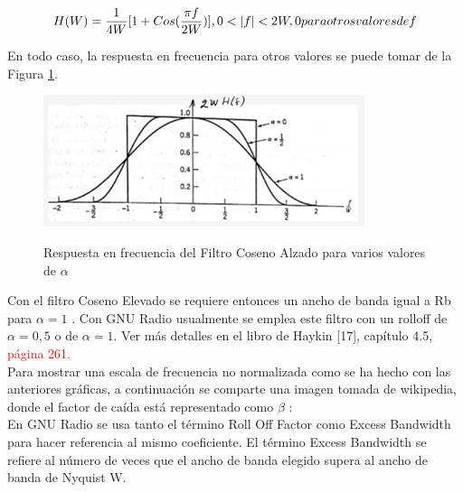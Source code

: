 \begin{equation} \label{capcuatro_veintiuno}
	 H(W) = \dfrac{1}{4W}[1+Cos(\frac{\pi f}{2W})] \space , 0 < |f| < 2W,\space  0 para otros valores de f
\end{equation}

En todo caso, la respuesta en frecuencia para otros valores se puede tomar de la Figura \ref{fig:Coseno-elevado}. \\

\begin{figure}[h!]
	\captionsetup{justification = raggedright, singlelinecheck = false}
	\caption{Respuesta en frecuencia del Filtro Coseno Alzado para varios valores de $\alpha $} 
	\centering
	\includegraphics[scale=1.2]{Imagenes/Coseno-elevado.png}
	\label{fig:Coseno-elevado}
\end{figure}

Con el filtro Coseno Elevado se requiere entonces un ancho de banda igual a Rb para $\alpha =1$ . Con GNU Radio usualmente se emplea este filtro con un rolloff de $\alpha=0,5$ o de $\alpha =1$. Ver más detalles en el libro de Haykin [17], capítulo 4.5, \textcolor{Red}{página 261.}\\
Para mostrar una escala de frecuencia no normalizada como se ha hecho con las anteriores gráficas, a continuación se comparte una imagen tomada de wikipedia, donde el factor de caída está representado como $ \beta $ : \\

En GNU Radio se usa tanto el término Roll Off Factor como Excess Bandwidth para hacer referencia al mismo coeficiente. El término Excess Bandwidth se refiere al número de veces que el ancho de banda elegido supera al ancho de banda de Nyquist W. \\


